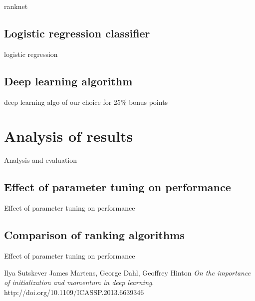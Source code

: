 \documentclass[english]{article}
\theoremstyle{definition}
\begin{document}
ranknet

\subsection{Logistic regression classifier}

logistic regression

\subsection{Deep learning algorithm}

deep learning algo of our choice for 25\% bonus points \cite{Sutskever}

\section{Analysis of results}

Analysis and evaluation

\subsection{Effect of parameter tuning on performance}

Effect of parameter tuning on performance

\subsection{Comparison of ranking algorithms}

Effect of parameter tuning on performance

\newpage
\begin{thebibliography}{9}
Ilya Sutskever James Martens, George Dahl, Geoffrey Hinton
\textit{On the importance of initialization and momentum in deep learning}. 
http://doi.org/10.1109/ICASSP.2013.6639346


\end{thebibliography}
\end{document}
